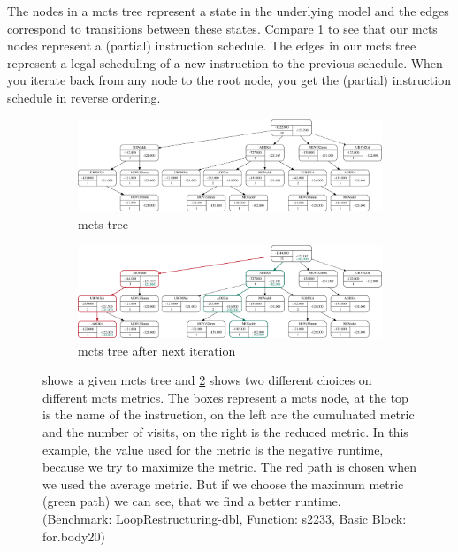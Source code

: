 The nodes in a \ac{mcts} tree represent a state in the underlying model and the edges correspond to transitions between these states.
Compare \cref{fig:approach:max-vs-avg:a} to see that our \ac{mcts} nodes represent a (partial) instruction schedule.
The edges in our \ac{mcts} tree represent a legal scheduling of a new instruction to the previous schedule.
When you iterate back from any node to the root node, you get the (partial) instruction schedule in reverse ordering.
\begin{figure}[p]
    \centering
    \begin{subfigure}[b]{0.3\textwidth}
        \centering
        \includegraphics[width=18cm,angle=90]{data/mcts-max-vs-avg/svg/selected/8752639012199.pdf}
        \caption{\ac{mcts} tree}
        \label{fig:approach:max-vs-avg:a}
    \end{subfigure}
    \hspace{0.2\textwidth}
    \begin{subfigure}[b]{0.3\textwidth}
        \centering
        \includegraphics[width=18cm,angle=90]{data/mcts-max-vs-avg/svg/selected/8752639012199-next.pdf}
        \caption{\ac{mcts} tree after next iteration}
        \label{fig:approach:max-vs-avg:b}
    \end{subfigure}
    \caption[\ac{mcts} tree with the consequences of maximum and average metric]{
         shows a given \ac{mcts} tree and \cref{fig:approach:max-vs-avg:b} shows two different choices on different \ac{mcts} metrics.
        The boxes represent a \ac{mcts} node, at the top is the name of the instruction, on the left are the cumuluated metric and the number of visits, on the right is the reduced metric.
        In this example, the value used for the metric is the negative runtime, because we try to maximize the metric.
        The red path is chosen when we used the average metric. But if we choose the maximum metric (green path) we can see, that we find a better runtime.\\
        (Benchmark: LoopRestructuring-dbl, Function: s2233, Basic Block: for.body20)
    }
    \label{fig:approach:max-vs-avg}
\end{figure}

